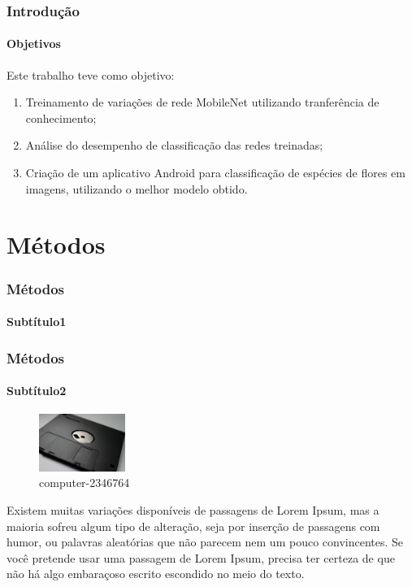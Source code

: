 \documentclass{beamer}
\begin{document}
    \begin{frame}
      \frametitle{Introdução}
      \framesubtitle{Objetivos}
      Este trabalho teve como objetivo:\medskip
      \begin{enumerate}        
        \item Treinamento de variações de rede MobileNet utilizando tranferência de conhecimento;        
        \medskip 
        \item Análise do desempenho de classificação das redes treinadas;       
        \medskip        
        \item Criação de um aplicativo Android para classificação de espécies de flores em imagens, utilizando o melhor modelo 			obtido.
        \medskip
      \end{enumerate}
    \end{frame}
    
    \section{Métodos} %
    \begin{frame}
      \frametitle{Métodos}
      \framesubtitle{Subtítulo1}      	      
    \end{frame}
        
    \begin{frame}
      \frametitle{Métodos}
      \framesubtitle{Subtítulo2}    
      \begin{figure}[htb]
        \begin{center}
          \caption{computer-2346764~\cite{computer-2346764}}
          \includegraphics[width=0.25\textwidth]{img/computer-2346764_1280.jpg}
        \end{center}
      \end{figure}
      \bigskip
      Existem muitas variações disponíveis de passagens de Lorem Ipsum, mas a maioria sofreu algum tipo de alteração, seja por inserção de passagens com humor, ou palavras aleatórias que não parecem nem um pouco convincentes. Se você pretende usar uma passagem de Lorem Ipsum, precisa ter certeza de que não há algo embaraçoso escrito escondido no meio do texto. 
    \end{frame}
    
\end{document}
